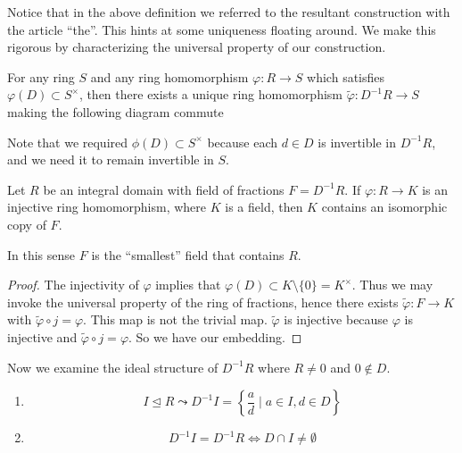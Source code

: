 \documentclass[master.tex]{subfiles}
\begin{document}
  Notice that in the above definition we referred to the resultant construction with the article ``the''. This hints at
  some uniqueness floating around. We make this rigorous by characterizing the universal property of our construction.
  \begin{prop}
    For any ring \(S\) and any ring homomorphism \(\varphi \colon R \to S\) which satisfies
    \(\varphi(D) \subset S^\times\), then there exists a unique ring homomorphism
    \(\tilde{\varphi} \colon D^{-1}R \to S\) making the following diagram commute
    \begin{figure}[h]
      \centering
    \end{figure}

    Note that we required $\phi(D) \subset S^\times$ because each $d \in D$ is invertible in $D^{-1}R$, and we need it to remain invertible in $S$.
  \end{prop}
  \begin{prop}
    Let \(R\) be an integral domain with field of fractions \(F=D^{-1}R\). If \(\varphi \colon R \to K\) is an injective
    ring homomorphism, where \(K\) is a field, then \(K\) contains an isomorphic copy of \(F\).
  \end{prop}
  In this sense \(F\) is the ``smallest'' field that contains \(R\).
  \begin{proof}
    The injectivity of \(\varphi\) implies that \(\varphi(D) \subset K \setminus \{0\} = K^\times\). Thus we may invoke
    the universal property of the ring of fractions, hence there exists \(\tilde{\varphi} \colon F \to K\) with
    \(\tilde{\varphi} \circ j = \varphi\). This map is not the trivial map.  \(\tilde{\varphi}\) is injective because $\varphi$ is injective and \(\tilde{\varphi} \circ j = \varphi\).  So we have our embedding.
  \end{proof}
  Now we examine the ideal structure of \(D^{-1}R\) where \(R \neq 0\) and \(0 \not \in D\).
  \begin{rmk} \mbox{}
    \begin{enumerate}[label=(\alph*)]
    \item \[I \unlhd R \leadsto D^{-1}I = \left\{\frac{a}{d} \mid a \in I, d \in D\right\}\]
    \item \[D^{-1}I = D^{-1}R \iff D \cap I \neq \emptyset\]
    \end{enumerate}
  \end{rmk}
\end{document}

